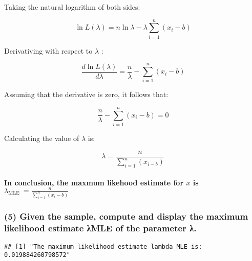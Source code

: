 \documentclass[
]{article}
\begin{document}
Taking the natural logarithm of both sides:

\[
\begin{equation*}
\ln L(\lambda)=n \ln \lambda-\lambda \sum_{i=1}^{n}\left(x_{i}-b\right) \tag{2}
\end{equation*}
\]

Derivativing with respect to \(\lambda\) :

\[
\begin{equation*}
\frac{d \ln L(\lambda)}{d \lambda}=\frac{n}{\lambda}-\sum_{i=1}^{n}\left(x_{i}-b\right) \tag{3}
\end{equation*}
\]

Assuming that the derivative is zero, it follows that:

\[
\begin{equation*}
\frac{n}{\lambda}-\sum_{i=1}^{n}\left(x_{i}-b\right)=0 \tag{4}
\end{equation*}
\]

Calculating the value of \(\lambda\) is:

\[
\begin{equation*}
\lambda=\frac{n}{\sum_{i=1}^{n}\left(x_{i-b}\right)} \tag{5}
\end{equation*}
\]

\paragraph{\texorpdfstring{In conclusion, the maxmum likehood estimate
for \(x\) is
\(\lambda_{\text {MLE }}=\frac{n}{\sum_{i=1}^{n}\left(x_{i}-b\right)}\)}{In conclusion, the maxmum likehood estimate for x is \textbackslash lambda\_\{\textbackslash text \{MLE \}\}=\textbackslash frac\{n\}\{\textbackslash sum\_\{i=1\}\^{}\{n\}\textbackslash left(x\_\{i\}-b\textbackslash right)\}}}\label{in-conclusion-the-maxmum-likehood-estimate-for-x-is-lambda_text-mle-fracnsum_i1nleftx_i-bright}

\subsubsection{(5) Given the sample, compute and display the maximum
likelihood estimate λMLE of the parameter
λ.}\label{given-the-sample-compute-and-display-the-maximum-likelihood-estimate-ux3bbmle-of-the-parameter-ux3bb.}

\begin{verbatim}
## [1] "The maximum likelihood estimate lambda_MLE is:  0.019884260798572"
\end{verbatim}
\end{document}
